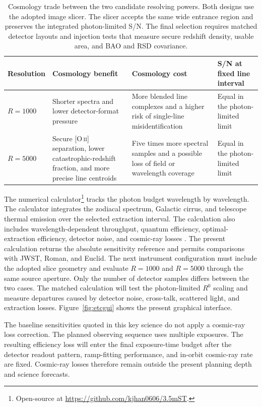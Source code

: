 \begin{table}[htbp]
\centering
\sffamily\small
\begin{tabularx}{\textwidth}{@{}p{2.5cm}p{3.6cm}YY@{}}
\toprule
\textbf{Resolution} & \textbf{Cosmology benefit} & \textbf{Cosmology cost} & \textbf{S/N at fixed line interval}\\
\midrule
$R=1000$ & Shorter spectra and lower detector-format pressure & More blended line complexes and a higher risk of single-line misidentification & Equal in the photon-limited limit\\
$R=5000$ & Secure [O\,\textsc{ii}] separation, lower catastrophic-redshift fraction, and more precise line centroids & Five times more spectral samples and a possible loss of field or wavelength coverage & Equal in the photon-limited limit
\end{tabularx}
\caption{Cosmology trade between the two candidate resolving powers. Both designs use the adopted image slicer. The slicer accepts the same wide entrance region and preserves the integrated photon-limited S/N. The final selection requires matched detector layouts and injection tests that measure secure redshift density, usable area, and BAO and RSD covariance.}
\label{tab:etcmodes}
\end{table}

The numerical calculator\footnote{Open-source at \url{https://github.com/kjhan0606/3.5mST}.} tracks the photon budget wavelength by wavelength. The calculator integrates the zodiacal spectrum, Galactic cirrus, and telescope thermal emission over the selected extraction interval. The calculation also includes wavelength-dependent throughput, quantum efficiency, optimal-extraction efficiency, detector noise, and cosmic-ray losses \cite{ienaka2013,jwstcrdocs}. The present calculation returns the absolute sensitivity reference and permits comparisons with JWST, Roman, and Euclid. The next instrument configuration must include the adopted slice geometry and evaluate $R=1000$ and $R=5000$ through the same source aperture. Only the number of detector samples differs between the two cases. The matched calculation will test the photon-limited $R^0$ scaling and measure departures caused by detector noise, cross-talk, scattered light, and extraction losses. Figure~\ref{fig:etcgui} shows the present graphical interface.

The baseline sensitivities quoted in this key science do not apply a cosmic-ray loss correction. The planned observing sequence uses multiple exposures. The resulting efficiency loss will enter the final exposure-time budget after the detector readout pattern, ramp-fitting performance, and in-orbit cosmic-ray rate are fixed. Cosmic-ray losses therefore remain outside the present planning depth and science forecasts.

